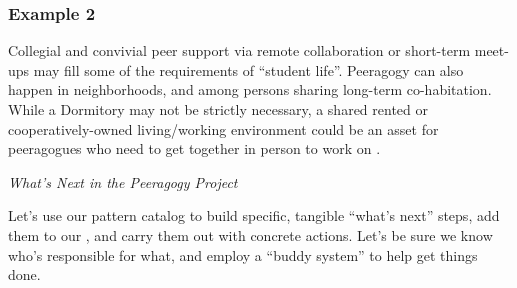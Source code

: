 \subsubsection*{Example 2}
Collegial and convivial peer support via remote collaboration or
short-term meet-ups may fill some of the requirements of ``student
life''.  Peeragogy can also happen in neighborhoods, and among persons
sharing long-term co-habitation.  While a Dormitory may not be
strictly necessary, a shared rented or cooperatively-owned
living\slash working environment could be an asset for peeragogues who
need to get together in person to work on .



\begin{framed}
\noindent 
\emph{What's Next in the Peeragogy Project}
\begin{collectinmacro}{\SpecificWN}{}{}
Let's use our pattern catalog to build specific, tangible ``what's
next'' steps, add them to our , and carry them
out with concrete actions.  Let's be sure we know who's responsible
for what, and employ a ``buddy system'' to help get things done.
\end{collectinmacro}
\SpecificWN
\end{framed}

